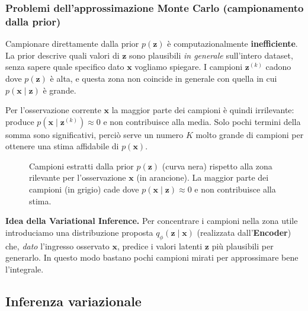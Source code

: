 \documentclass[11pt,a4paper]{article}
\newcommand{\assi}{%
  \draw[->, thick] (-3.3,0) -- (3.6,0) node[right] {$\mathbf{z}$};
  \draw[->, thick] (-3.1,0) -- (-3.1,3.1) node[above] {densità};
}
\newcommand{\basefig}[1]{%
  \assi
  \fill[orange!35, domain=0.2:2.2, samples=40]
      (0.2,0) -- plot (\x, {2.4*exp(-(\x-1.2)*(\x-1.2)/0.2)}) -- (2.2,0) -- cycle;
  \draw[very thick, orange!80!black, domain=0.2:2.2, samples=40]
      plot (\x, {2.4*exp(-(\x-1.2)*(\x-1.2)/0.2)});
  \node[right, align=left, font=\small\bfseries, orange!70!black] at (1.9,2.3) {#1};
  \draw[very thick, black, domain=-3:3, samples=80]
      plot (\x, {1.3*exp(-\x*\x/2)});
  \node[left, font=\small\bfseries] at (-1.0,1.0) {$p(\mathbf{z})$};
}
\newcommand{\campioniprior}{%
  \foreach \s in {-2.4,-1.7,-1.1,-0.6,-0.1,0.4,2.3} {
    \draw[gray!70, very thick] (\s,-0.1) -- (\s,-0.4);
  }
  \draw[orange!90!black, very thick] (1.1,-0.1) -- (1.1,-0.4);
}
\begin{document}
\subsubsection{Problemi dell'approssimazione Monte Carlo (campionamento dalla prior)}

Campionare direttamente dalla prior $p(\mathbf{z})$ è computazionalmente
\textbf{inefficiente}. La prior descrive quali valori di $\mathbf{z}$ sono plausibili
\emph{in generale} sull'intero dataset, senza sapere quale specifico dato $\mathbf{x}$
vogliamo spiegare. I campioni $\mathbf{z}^{(k)}$ cadono dove $p(\mathbf{z})$ è alta, e
questa zona non coincide in generale con quella in cui $p(\mathbf{x}\mid\mathbf{z})$ è grande.

Per l'osservazione corrente $\mathbf{x}$ la maggior parte dei campioni è quindi
irrilevante: produce $p(\mathbf{x}\mid\mathbf{z}^{(k)})\approx 0$ e non contribuisce alla
media. Solo pochi termini della somma sono significativi, perciò serve un numero
$K$ molto grande di campioni per ottenere una stima affidabile di $p(\mathbf{x})$.

\begin{figure}[H]
\centering
{}
\caption{Campioni estratti dalla prior $p(\mathbf{z})$ (curva nera) rispetto alla zona
rilevante per l'osservazione $\mathbf{x}$ (in arancione). La maggior parte dei campioni
(in grigio) cade dove $p(\mathbf{x}\mid\mathbf{z})\approx 0$ e non contribuisce alla stima.}
\end{figure}

\noindent\textbf{Idea della Variational Inference.} Per concentrare i campioni nella zona
utile introduciamo una distribuzione proposta $q_\phi(\mathbf{z}\mid\mathbf{x})$ (realizzata
dall'\textbf{Encoder}) che, \emph{dato} l'ingresso osservato $\mathbf{x}$, predice i valori
latenti $\mathbf{z}$ più plausibili per generarlo. In questo modo bastano pochi campioni
mirati per approssimare bene l'integrale.

\subsection{Inferenza variazionale}
\end{document}
